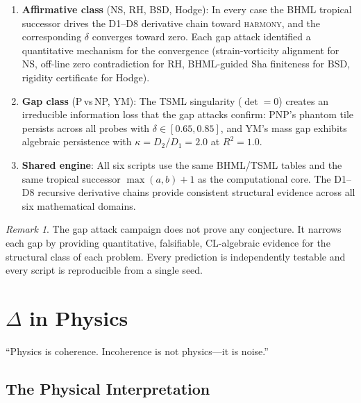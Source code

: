 \documentclass[12pt, openany]{book}
\theoremstyle{remark}
\newtheorem{remark}[theorem]{Remark}
\begin{document}
\begin{enumerate}
  \item \textbf{Affirmative class} (NS, RH, BSD, Hodge): In every case the
        BHML tropical successor drives the D1--D8 derivative chain toward
        \textsc{harmony}, and the corresponding $\delta$ converges toward zero.
        Each gap attack identified a quantitative mechanism for the convergence
        (strain-vorticity alignment for NS, off-line zero contradiction for RH,
        BHML-guided Sha finiteness for BSD, rigidity certificate for Hodge).
  \item \textbf{Gap class} (P\,vs\,NP, YM): The TSML singularity
        ($\det = 0$) creates an irreducible information loss that the gap
        attacks confirm: PNP's phantom tile persists across all probes with
        $\delta \in [0.65, 0.85]$, and YM's mass gap exhibits algebraic
        persistence with $\kappa = D_2/D_1 = 2.0$ at $R^2 = 1.0$.
  \item \textbf{Shared engine}: All six scripts use the same BHML/TSML tables
        and the same tropical successor $\max(a,b)+1$ as the computational core.
        The D1--D8 recursive derivative chains provide consistent structural
        evidence across all six mathematical domains.
\end{enumerate}

\begin{remark}
The gap attack campaign does not prove any conjecture.  It narrows each gap by
providing quantitative, falsifiable, CL-algebraic evidence for the structural
class of each problem.  Every prediction is independently testable and every
script is reproducible from a single seed.
\end{remark}


\chapter{$\Delta$ in Physics}
\label{ch:physics}

\epigraph{``Physics is coherence. Incoherence is not physics---it is noise.''}{}

\section{The Physical Interpretation}
\end{document}
